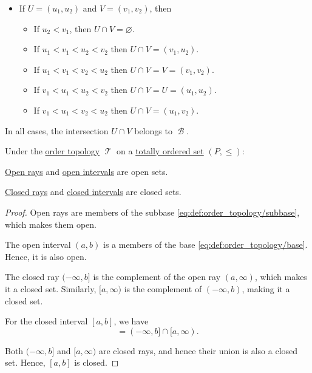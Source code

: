\begin{defproof}
\begin{itemize}
    \item If \( U = (u_1, u_2) \) and \( V = (v_1, v_2) \), then
    \begin{itemize}
      \item If \( u_2 < v_1 \), then \( U \cap V = \varnothing \).
      \item If \( u_1 < v_1 < u_2 < v_2 \) then \( U \cap V = (v_1, u_2) \).
      \item If \( u_1 < v_1 < v_2 < u_2 \) then \( U \cap V = V = (v_1, v_2) \).
      \item If \( v_1 < u_1 < u_2 < v_2 \) then \( U \cap V = U = (u_1, u_2) \).
      \item If \( v_1 < u_1 < v_2 < u_2 \) then \( U \cap V = (u_1, v_2) \).
    \end{itemize}
  \end{itemize}

  In all cases, the intersection \( U \cap V \) belongs to \( \mscrB \).
\end{defproof}

\begin{proposition}\label{thm:order_topology_intervals}
  Under the \hyperref[def:order_topology]{order topology} \( \mscrT \) on a \hyperref[def:totally_ordered_set]{totally ordered set} \( (P, \leq) \):
  \begin{thmenum}
     \hyperref[def:order_interval/unbounded]{Open rays} and \hyperref[def:order_interval/open]{open intervals} are open sets.

     \hyperref[def:order_interval/unbounded]{Closed rays} and \hyperref[def:order_interval/closed]{closed intervals} are closed sets.
  \end{thmenum}
\end{proposition}
\begin{proof}
   Open rays are members of the subbase \eqref{eq:def:order_topology/subbase}, which makes them open.

  The open interval \( (a, b) \) is a members of the base \eqref{eq:def:order_topology/base}. Hence, it is also open.

   The closed ray \( (-\infty, b] \) is the complement of the open ray \( (a, \infty) \), which makes it a closed set. Similarly, \( [a, \infty) \) is the complement of \( (-\infty, b) \), making it a closed set.

  For the closed interval \( [a, b] \), we have
  \begin{equation*}
    [a, b] = (-\infty, b] \cap [a, \infty).
  \end{equation*}

  Both \( (-\infty, b] \) and \( [a, \infty) \) are closed rays, and hence their union is also a closed set. Hence, \( [a, b] \) is closed.
\end{proof}

